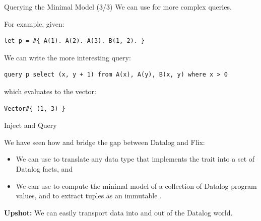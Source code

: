 \begin{frame}[fragile]{Querying the Minimal Model (3/3)}
We can use  for more complex queries.

For example, given: 

\begin{lstlisting}[language=flix, xleftmargin=0.8cm]
let p = #{ A(1). A(2). A(3). B(1, 2). }
\end{lstlisting}

We can write the more interesting query:

\begin{lstlisting}[language=flix, xleftmargin=0.8cm]
query p select (x, y + 1) from A(x), A(y), B(x, y) where x > 0 
\end{lstlisting}

which evaluates to the vector:

\begin{lstlisting}[language=flix, xleftmargin=0.8cm]
Vector#{ (1, 3) }
\end{lstlisting}
\end{frame}

\begin{frame}[fragile]{Inject and Query}

We have seen how  and  bridge the gap between Datalog
and Flix:

\begin{itemize}
    \item We can use  to translate any data type that implements
    the  trait into a set of Datalog facts, and
    \item We can use  to compute the minimal model of a collection
    of Datalog program values, and to extract tuples as an immutable
    .
\end{itemize}

\textbf{Upshot:} We can easily transport data into and out of the Datalog world.
\end{frame}


